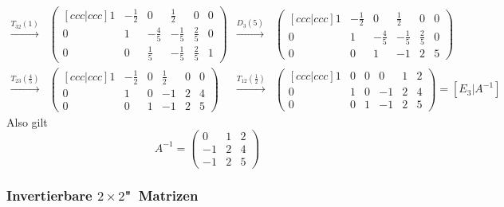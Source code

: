 \documentclass[a4paper]{article}
\begin{document}
\begin{align*}
    \xrightarrow{T_{32}(1)}
                & \begin{pmatrix}[ccc|ccc]
                      1 & -\frac{1}{2} & 0            & \frac{1}{2}  & 0           & 0 \\
                      0 & 1            & -\frac{4}{5} & -\frac{1}{5} & \frac{2}{5} & 0 \\
                      0 & 0            & \frac{1}{5}  & -\frac{1}{5} & \frac{2}{5} & 1
                  \end{pmatrix} &
    \xrightarrow{D_3(5)}
                & \begin{pmatrix}[ccc|ccc]
                      1 & -\frac{1}{2} & 0            & \frac{1}{2}  & 0           & 0 \\
                      0 & 1            & -\frac{4}{5} & -\frac{1}{5} & \frac{2}{5} & 0 \\
                      0 & 0            & 1            & -1           & 2           & 5
                  \end{pmatrix} \\
    \xrightarrow{T_{23}(\frac{4}{5})}
                & \begin{pmatrix}[ccc|ccc]
                      1 & -\frac{1}{2} & 0 & \frac{1}{2} & 0 & 0 \\
                      0 & 1            & 0 & -1          & 2 & 4 \\
                      0 & 0            & 1 & -1          & 2 & 5
                  \end{pmatrix}                       &
    \xrightarrow{T_{12}(\frac{1}{2})}
                & \begin{pmatrix}[ccc|ccc]
                      1 & 0 & 0 & 0  & 1 & 2 \\
                      0 & 1 & 0 & -1 & 2 & 4 \\
                      0 & 0 & 1 & -1 & 2 & 5
                  \end{pmatrix} = [E_3|A^{-1}]
\end{align*}
Also gilt
\begin{equation*}
    A^{-1} = \begin{pmatrix}
        0  & 1 & 2 \\
        -1 & 2 & 4 \\
        -1 & 2 & 5
    \end{pmatrix}
\end{equation*}

\subsubsection{Invertierbare \texorpdfstring{$2\times2$}{2x2}"~Matrizen}
\end{document}
